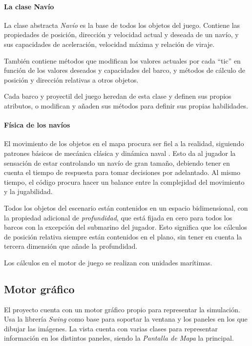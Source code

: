 \documentclass[a4paper,
	11pt,
	parskip=full,
	bibliography=totoc,
	twoside
	]{scrartcl}
\begin{document}
		\paragraph{La clase Navío}
			La clase abstracta \textit{Navío} es la base de todos los objetos del juego. Contiene las propiedades de posición, dirección y velocidad actual y deseada de un navío, y sus capacidades de aceleración, velocidad máxima y relación de viraje.
			
			También contiene métodos que modifican los valores actuales por cada ``tic'' en función de los valores deseados y capacidades del barco, y métodos de cálculo de posición y dirección relativas a otros objetos.
			
			Cada barco y proyectil del juego heredan de esta clase y definen sus propios atributos, o modifican y añaden sus métodos para definir sus propias habilidades.
			
		\paragraph{Física de los navíos}
			El movimiento de los objetos en el mapa procura ser fiel a la realidad, siguiendo patrones básicos de mecánica clásica y dinámica naval \cite{marine_insight, discover_boating, ships_business}. Esto da al jugador la sensación de estar controlando un navío de gran tamaño, debiendo tener en cuenta el tiempo de respuesta para tomar decisiones por adelantado. Al mismo tiempo, el código procura hacer un balance entre la complejidad del movimiento y la jugabilidad.
			
			Todos los objetos del escenario están contenidos en un espacio bidimensional, con la propiedad adicional de \textit{profundidad}, que está fijada en cero para todos los barcos con la excepción del submarino del jugador. Esto significa que los cálculos de posición relativa siempre están contenidos en el plano, sin tener en cuenta la tercera dimensión que añade la profundidad.
			
			Los cálculos en el motor de juego se realizan con unidades marítimas.
	
	\subsection{Motor gráfico}
	\label{subsec:motor_grafico}
		El proyecto cuenta con un motor gráfico propio para representar la simulación. Usa la librería \textit{Swing} como base para soportar la ventana y los paneles en los que dibujar las imágenes. La vista cuenta con varias clases para representar información en los distintos paneles, siendo la \textit{Pantalla de Mapa} la principal. \cite{techrepublic_java2d, so_resource_stream, so_rendering}
		
\end{document}
